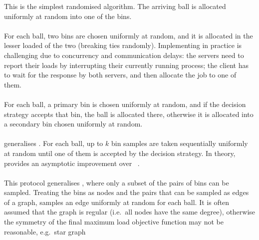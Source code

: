 This is the simplest randomised algorithm. The arriving ball is allocated uniformly at random into one of the bins.

\paragraph{\TwoChoice}
For each ball, two bins are chosen uniformly at random, and it is allocated in the lesser loaded of the two (breaking ties randomly). Implementing \TwoChoice in practice is challenging due to concurrency and communication delays: the servers need to report their loads by interrupting their currently running process; the client has to wait for the response by both servers, and then allocate the job to one of them.



\paragraph{\TwoThinning}

For each ball, a primary bin is chosen uniformly at random, and if the decision strategy accepts that bin, the ball is allocated there, otherwise it is allocated into a secondary bin chosen uniformly at random.


\paragraph{\KThinning}

\KThinning generalises \TwoThinning. For each ball, up to $k$ bin samples are taken sequentially uniformly at random until one of them is accepted by the decision strategy. In theory, \KThinning provides an asymptotic improvement over \TwoThinning~\cite{feldheim2020dthinning, los2021quantilethreshold}.


\paragraph{\GraphicalTwoChoice}
This protocol generalises \TwoChoice, where only a subset of the pairs of bins can be sampled. Treating the bins as nodes and the pairs that can be sampled as edges of a graph, \GraphicalTwoChoice samples an edge uniformly at random for each ball. It is often assumed that the graph is regular (i.e.\ all nodes have the same degree), otherwise the symmetry of the final maximum load objective function may not be reasonable, e.g.\ star graph

